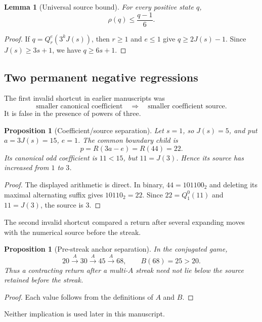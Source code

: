 \documentclass[11pt,a4paper]{article}
\newtheorem{proposition}[theorem]{Proposition}
\newtheorem{lemma}[theorem]{Lemma}
\theoremstyle{definition}
\theoremstyle{remark}
\begin{document}
\begin{lemma}[Universal source bound]\label{lem:source-bound}
For every positive state $q$,
\[
  \rho(q)\le\frac{q-1}{6}.
\]
\end{lemma}

\begin{proof}
If $q=Q_r^e(3^k J(s))$, then $r\ge1$ and $e\le1$ give
$q\ge2J(s)-1$.  Since $J(s)\ge3s+1$, we have $q\ge6s+1$.
\end{proof}

\subsection{Two permanent negative regressions}

The first invalid shortcut in earlier manuscripts was
\[
 \text{smaller canonical coefficient}
 \quad\Longrightarrow\quad
 \text{smaller coefficient source}.
\]
It is false in the presence of powers of three.

\begin{proposition}[Coefficient/source separation]\label{prop:coeff-source-counter}
Let $s=1$, so $J(s)=5$, and put $a=3J(s)=15$, $e=1$.  The common boundary
child is
\[
 p=R(3a-e)=R(44)=22.
\]
Its canonical odd coefficient is $11<15$, but $11=J(3)$.  Hence its source
has increased from $1$ to $3$.
\end{proposition}

\begin{proof}
The displayed arithmetic is direct.  In binary, $44=101100_2$ and deleting
its maximal alternating suffix gives $10110_2=22$.  Since
$22=Q_1^0(11)$ and $11=J(3)$, the source is $3$.
\end{proof}

The second invalid shortcut compared a return after several expanding moves
with the numerical source before the streak.

\begin{proposition}[Pre-streak anchor separation]\label{prop:prestreak}
In the conjugated game,
\[
  20\xrightarrow{A}30\xrightarrow{A}45\xrightarrow{A}68,
  \qquad B(68)=25>20.
\]
Thus a contracting return after a multi-$A$ streak need not lie below the
source retained before the streak.
\end{proposition}

\begin{proof}
Each value follows from the definitions of $A$ and $B$.
\end{proof}

Neither implication is used later in this manuscript.
\end{document}
